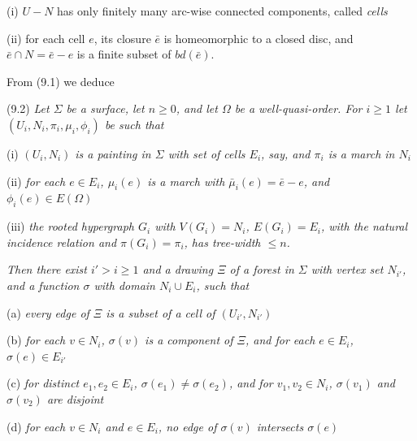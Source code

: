 \hspace*{12pt}(i) $U - N$ has only finitely many arc-wise connected components, called \textit{cells}

\hspace*{12pt}(ii) for each cell $e$, its closure $\bar{e}$ is homeomorphic to a closed disc, and $\bar{e} \cap N = \bar{e} - e$ is a finite subset of $bd(\bar{e})$.

From (9.1) we deduce

\stmt
(9.2) \textit{Let $\Sigma$ be a surface, let $n \ge 0$, and let $\Omega$ be a well-quasi-order. For $i \ge 1$ let $(U_i, N_i, \pi_i, \mu_i, \phi_i)$ be such that}

\hspace*{12pt}(i) \textit{$(U_i, N_i)$ is a painting in $\Sigma$ with set of cells $E_i$, say, and $\pi_i$ is a march in $N_i$}

\hspace*{12pt}(ii) \textit{for each $e \in E_i$, $\mu_i(e)$ is a march with $\bar{\mu}_i(e) = \bar{e} - e$, and $\phi_i(e) \in E(\Omega)$}

\hspace*{12pt}(iii) \textit{the rooted hypergraph $G_i$ with $V(G_i) = N_i$, $E(G_i) = E_i$, with the natural incidence relation and $\pi(G_i) = \pi_i$, has tree-width $\le n$.}

\textit{Then there exist $i' > i \ge 1$ and a drawing $\Xi$ of a forest in $\Sigma$ with vertex set $N_{i'}$, and a function $\sigma$ with domain $N_i \cup E_i$, such that}

\hspace*{12pt}(a) \textit{every edge of $\Xi$ is a subset of a cell of $(U_{i'}, N_{i'})$}

\hspace*{12pt}(b) \textit{for each $v \in N_i$, $\sigma(v)$ is a component of $\Xi$, and for each $e \in E_i$, $\sigma(e) \in E_{i'}$}

\hspace*{12pt}(c) \textit{for distinct $e_1, e_2 \in E_i$, $\sigma(e_1) \ne \sigma(e_2)$, and for  $v_1, v_2 \in N_i$, $\sigma(v_1)$ and $\sigma(v_2)$ are disjoint}

\hspace*{12pt}(d) \textit{for each $v \in N_i$ and $e \in E_i$, no edge of $\sigma(v)$ intersects $\sigma(e)$}


